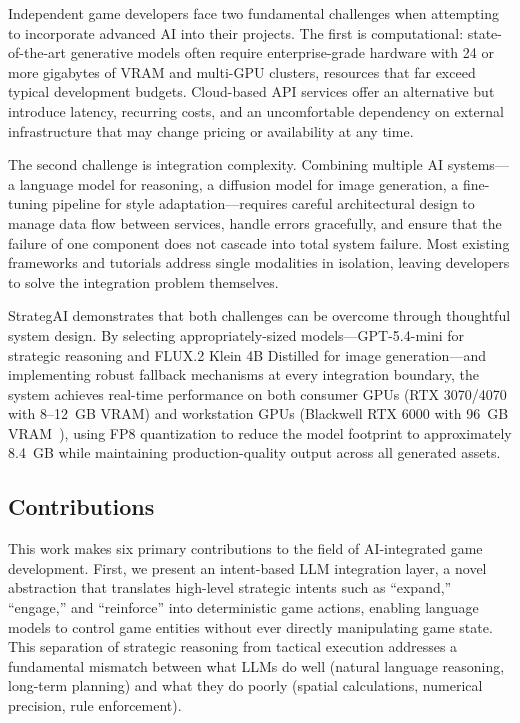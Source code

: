 \documentclass[conference]{IEEEtran}
\begin{document}
Independent game developers face two fundamental challenges when attempting to incorporate advanced AI into their projects. The first is computational: state-of-the-art generative models often require enterprise-grade hardware with 24 or more gigabytes of VRAM and multi-GPU clusters, resources that far exceed typical development budgets. Cloud-based API services offer an alternative but introduce latency, recurring costs, and an uncomfortable dependency on external infrastructure that may change pricing or availability at any time.

The second challenge is integration complexity. Combining multiple AI systems---a language model for reasoning, a diffusion model for image generation, a fine-tuning pipeline for style adaptation---requires careful architectural design to manage data flow between services, handle errors gracefully, and ensure that the failure of one component does not cascade into total system failure. Most existing frameworks and tutorials address single modalities in isolation, leaving developers to solve the integration problem themselves.

StrategAI demonstrates that both challenges can be overcome through thoughtful system design. By selecting appropriately-sized models---GPT-5.4-mini for strategic reasoning and FLUX.2 Klein 4B Distilled for image generation---and implementing robust fallback mechanisms at every integration boundary, the system achieves real-time performance on both consumer GPUs (RTX 3070/4070 with 8--12~GB VRAM) and workstation GPUs (Blackwell RTX 6000 with 96~GB VRAM~\cite{nvidia2024blackwell}), using FP8 quantization to reduce the model footprint to approximately 8.4~GB while maintaining production-quality output across all generated assets.

\subsection{Contributions}

This work makes six primary contributions to the field of AI-integrated game development. First, we present an intent-based LLM integration layer, a novel abstraction that translates high-level strategic intents such as ``expand,'' ``engage,'' and ``reinforce'' into deterministic game actions, enabling language models to control game entities without ever directly manipulating game state. This separation of strategic reasoning from tactical execution addresses a fundamental mismatch between what LLMs do well (natural language reasoning, long-term planning) and what they do poorly (spatial calculations, numerical precision, rule enforcement).
\end{document}
